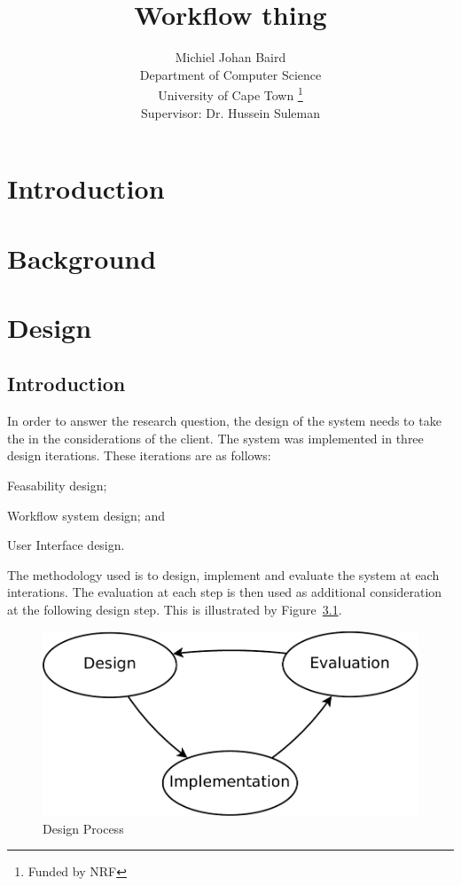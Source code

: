 \documentclass[12pt,a4paper]{report}
\title{Workflow thing}
\author{Michiel Johan Baird \\
        Department of Computer Science \\
        University of Cape Town
        \thanks{Funded by NRF}
    \\   \small{Supervisor: Dr. Hussein Suleman} }
\begin{document}

\tableofcontents
\newpage
\listoffigures
\newpage
\chapter{Introduction}
\chapter{Background}
\chapter{Design}
\section{Introduction}
In order to answer the research question, the design of the system needs
to take the in the considerations of the client. The  system
was implemented in three design iterations. These iterations are
as follows: \begin{inparaenum}[(i)] \item Feasability design;
\item Workflow system design; and \item User Interface design.
\end{inparaenum} The methodology used is to design, implement
and evaluate the system at each interations. The evaluation at
each step is then used as additional consideration at the following
design step. This is illustrated by Figure~\ref{design_figure}.

\begin{figure}[!h]
\begin{center}
\includegraphics[scale=0.5]{figures/design_cycle.pdf}
\end{center}
\caption{Design Process}
\label{design_figure}
\end{figure}
\end{document}

